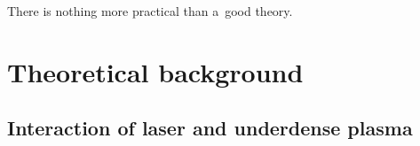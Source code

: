 \documentclass[10pt, a4paper, twoside, openright]{report}
\begin{document}

\begin{savequote}[0.45\linewidth]
	\begin{fquote}
		 There is nothing more practical than a~good theory.
	\end{fquote}
\end{savequote}

\chapter{Theoretical background\label{chap:theoretical_background}}

\section{Interaction of laser and underdense plasma}
%

%

%

%

%

%

%
\end{document}
